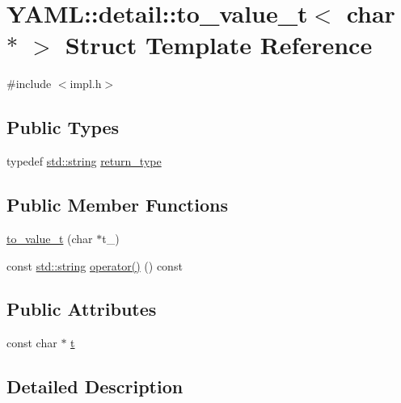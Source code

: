 \hypertarget{struct_y_a_m_l_1_1detail_1_1to__value__t_3_01char_01_5_01_4}{}\section{Y\+A\+ML\+::detail\+::to\+\_\+value\+\_\+t$<$ char $\ast$ $>$ Struct Template Reference}
\label{struct_y_a_m_l_1_1detail_1_1to__value__t_3_01char_01_5_01_4}


{\ttfamily \#include $<$impl.\+h$>$}

\subsection*{Public Types}
\begin{DoxyCompactItemize}
\item 
typedef \mbox{\hyperlink{glad_8h_ac83513893df92266f79a515488701770}{std\+::string}} \mbox{\hyperlink{struct_y_a_m_l_1_1detail_1_1to__value__t_3_01char_01_5_01_4_afaa36e2e46326f4b6d7c437104cc79e5}{return\+\_\+type}}
\end{DoxyCompactItemize}
\subsection*{Public Member Functions}
\begin{DoxyCompactItemize}
\item 
\mbox{\hyperlink{struct_y_a_m_l_1_1detail_1_1to__value__t_3_01char_01_5_01_4_a572becb20cb9b1d5d1ffb34a5dcaef27}{to\+\_\+value\+\_\+t}} (char $\ast$t\+\_\+)
\item 
const \mbox{\hyperlink{glad_8h_ac83513893df92266f79a515488701770}{std\+::string}} \mbox{\hyperlink{struct_y_a_m_l_1_1detail_1_1to__value__t_3_01char_01_5_01_4_a9b2606c8624eb1476cea7d8892aa148a}{operator()}} () const
\end{DoxyCompactItemize}
\subsection*{Public Attributes}
\begin{DoxyCompactItemize}
\item 
const char $\ast$ \mbox{\hyperlink{struct_y_a_m_l_1_1detail_1_1to__value__t_3_01char_01_5_01_4_ab8bc9dca5f7e77303f6750292d34cb4d}{t}}
\end{DoxyCompactItemize}


\subsection{Detailed Description}
